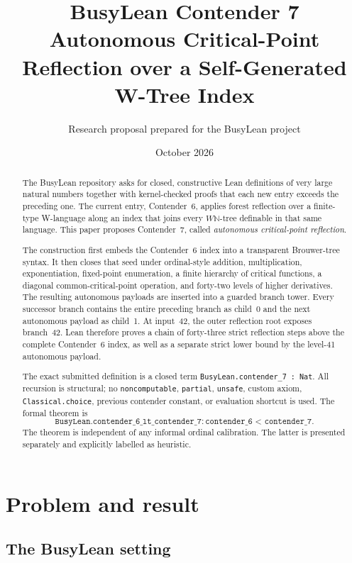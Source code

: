 \documentclass[11pt]{article}
\title{\textbf{BusyLean Contender 7}\\[0.35em]
\Large Autonomous Critical-Point Reflection over a Self-Generated W-Tree Index}
\author{Research proposal prepared for the BusyLean project}
\date{October 2026}
\theoremstyle{definition}
\theoremstyle{remark}
\newcommand{\N}{\ensuremath{\mathbb{N}}}
\newcommand{\lean}[1]{\texttt{#1}}
\begin{document}
\maketitle

\begin{abstract}
The BusyLean repository asks for closed, constructive Lean definitions of very
large natural numbers together with kernel-checked proofs that each new entry
exceeds the preceding one.  The current entry, Contender~6, applies forest
reflection over a finite-type W-language along an index that joins every
$W\N$-tree definable in that same language.  This paper proposes Contender~7,
called \emph{autonomous critical-point reflection}.

The construction first embeds the Contender~6 index into a transparent
Brouwer-tree syntax.  It then closes that seed under ordinal-style addition,
multiplication, exponentiation, fixed-point enumeration, a finite hierarchy of
critical functions, a diagonal common-critical-point operation, and forty-two
levels of higher derivatives.  The resulting autonomous payloads are inserted
into a guarded branch tower.  Every successor branch contains the entire
preceding branch as child~0 and the next autonomous payload as child~1.  At
input~42, the outer reflection root exposes branch~42.  Lean therefore proves a
chain of forty-three strict reflection steps above the complete Contender~6
index, as well as a separate strict lower bound by the level-41 autonomous
payload.

The exact submitted definition is a closed term
\lean{BusyLean.contender\_7 : Nat}.  All recursion is structural; no
\lean{noncomputable}, \lean{partial}, \lean{unsafe}, custom axiom,
\lean{Classical.choice}, previous contender constant, or evaluation shortcut is
used.  The formal theorem is
\[
  \lean{BusyLean.contender\_6\_lt\_contender\_7} :
  \lean{contender\_6 < contender\_7}.
\]
The theorem is independent of any informal ordinal calibration.  The latter is
presented separately and explicitly labelled as heuristic.
\end{abstract}

\tableofcontents

\section{Problem and result}

\subsection{The BusyLean setting}
\end{document}
